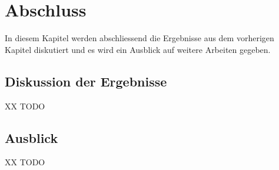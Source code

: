 \chapter{Abschluss}
\label{chapter:conclusion}
In diesem Kapitel werden abschliessend die Ergebnisse aus dem vorherigen Kapitel diskutiert und es wird ein Ausblick auf weitere Arbeiten gegeben.

\section{Diskussion der Ergebnisse}
XX TODO \\

\section{Ausblick}
XX TODO \\


